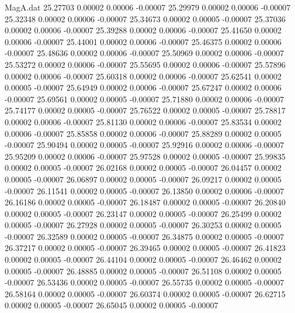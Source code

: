 \begin{filecontents}{MagA.dat}
  25.27703    0.00002    0.00006   -0.00007
  25.29979    0.00002    0.00006   -0.00007
  25.32348    0.00002    0.00006   -0.00007
  25.34673    0.00002    0.00005   -0.00007
  25.37036    0.00002    0.00006   -0.00007
  25.39288    0.00002    0.00006   -0.00007
  25.41650    0.00002    0.00006   -0.00007
  25.44001    0.00002    0.00006   -0.00007
  25.46375    0.00002    0.00006   -0.00007
  25.48636    0.00002    0.00006   -0.00007
  25.50969    0.00002    0.00006   -0.00007
  25.53272    0.00002    0.00006   -0.00007
  25.55695    0.00002    0.00006   -0.00007
  25.57896    0.00002    0.00006   -0.00007
  25.60318    0.00002    0.00006   -0.00007
  25.62541    0.00002    0.00005   -0.00007
  25.64949    0.00002    0.00006   -0.00007
  25.67247    0.00002    0.00006   -0.00007
  25.69561    0.00002    0.00005   -0.00007
  25.71880    0.00002    0.00006   -0.00007
  25.74177    0.00002    0.00005   -0.00007
  25.76522    0.00002    0.00005   -0.00007
  25.78817    0.00002    0.00006   -0.00007
  25.81130    0.00002    0.00006   -0.00007
  25.83534    0.00002    0.00006   -0.00007
  25.85858    0.00002    0.00006   -0.00007
  25.88289    0.00002    0.00005   -0.00007
  25.90494    0.00002    0.00005   -0.00007
  25.92916    0.00002    0.00006   -0.00007
  25.95209    0.00002    0.00006   -0.00007
  25.97528    0.00002    0.00005   -0.00007
  25.99835    0.00002    0.00005   -0.00007
  26.02168    0.00002    0.00005   -0.00007
  26.04457    0.00002    0.00005   -0.00007
  26.06897    0.00002    0.00005   -0.00007
  26.09217    0.00002    0.00005   -0.00007
  26.11541    0.00002    0.00005   -0.00007
  26.13850    0.00002    0.00006   -0.00007
  26.16186    0.00002    0.00005   -0.00007
  26.18487    0.00002    0.00005   -0.00007
  26.20840    0.00002    0.00005   -0.00007
  26.23147    0.00002    0.00005   -0.00007
  26.25499    0.00002    0.00005   -0.00007
  26.27928    0.00002    0.00005   -0.00007
  26.30253    0.00002    0.00005   -0.00007
  26.32589    0.00002    0.00005   -0.00007
  26.34875    0.00002    0.00005   -0.00007
  26.37217    0.00002    0.00005   -0.00007
  26.39465    0.00002    0.00005   -0.00007
  26.41823    0.00002    0.00005   -0.00007
  26.44104    0.00002    0.00005   -0.00007
  26.46462    0.00002    0.00005   -0.00007
  26.48885    0.00002    0.00005   -0.00007
  26.51108    0.00002    0.00005   -0.00007
  26.53436    0.00002    0.00005   -0.00007
  26.55735    0.00002    0.00005   -0.00007
  26.58164    0.00002    0.00005   -0.00007
  26.60374    0.00002    0.00005   -0.00007
  26.62715    0.00002    0.00005   -0.00007
  26.65045    0.00002    0.00005   -0.00007

\end{filecontents}
